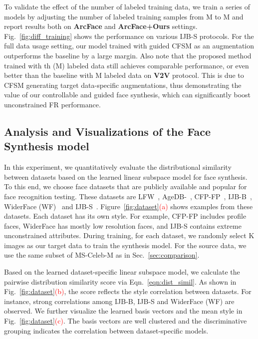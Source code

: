 To validate the effect of the number of labeled training data, we train a series of models by adjusting the number of labeled training samples from M to M and report results both on \textbf{ArcFace} and \textbf{ArcFace+Ours} settings. Fig.~\ref{fig:diff_training} shows the performance on various IJB-S protocols. For the full data usage setting, our model trained with guided CFSM as an augmentation outperforms the baseline by a large margin.
Also note that the proposed method trained with th (M) labeled data still achieves comparable performance, or even better than the baseline with M labeled data on \textbf{V2V} protocol. This is due to CFSM generating target data-specific augmentations, thus demonstrating the value of our controllable and guided face synthesis, which can significantly boost unconstrained FR performance. 




\subsection{Analysis and Visualizations of the Face Synthesis model}\label{sec:exp_dist_simi}
In this experiment, we quantitatively evaluate the distributional similarity between datasets based on the learned linear subspace model for face synthesis. To this end, we choose  face datasets that are publicly available and popular for face recognition testing. These datasets are LFW~\cite{huang2008labeled}, AgeDB-~\cite{moschoglou2017agedb}, CFP-FP~\cite{sengupta2016frontal}, IJB-B~\cite{whitelam2017iarpa}, WiderFace (WF)~\cite{yang2016wider} and IJB-S~\cite{kalka2018ijb}. 
Figure~\ref{fig:dataset}\textcolor{red}{(a)} shows examples from these  datasets. Each dataset has its own style. For example, CFP-FP includes profile faces, WiderFace has mostly low resolution faces, and IJB-S contains extreme unconstrained attributes. 
During training, for each dataset, we randomly select K images as our target data to train the synthesis model. For the source data, we use the same subset of MS-Celeb-M as in Sec.~\ref{sec:comparison}.

Based on the learned dataset-specific linear subspace model, we calculate the pairwise distribution similarity score via Eqn.~\ref{eqn:dist_simil}. As shown in Fig.~\ref{fig:dataset}\textcolor{red}{(b)}, the score reflects the style correlation between datasets. For instance, strong correlations among IJB-B, IJB-S and WiderFace (WF) are observed. We further visualize the learned basis vectors  and the mean style  in Fig.~\ref{fig:dataset}\textcolor{red}{(c)}. The basis vectors are well clustered and the discriminative grouping indicates the correlation between dataset-specific models. 


